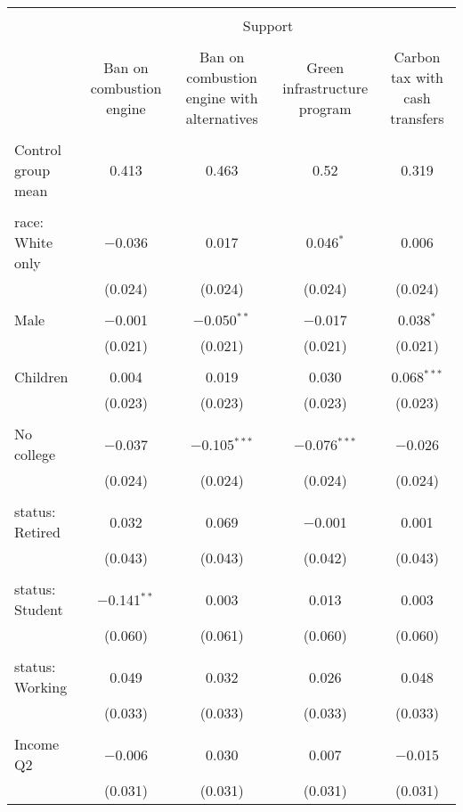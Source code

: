 
\begin{tabular}{@{\extracolsep{5pt}}lcccc} 
\\[-1.8ex]\hline 
\hline \\[-1.8ex] 
 & \multicolumn{4}{c}{Support} \\ 
\cline{2-5} 
\\[-1.8ex] & Ban on combustion engine & Ban on combustion engine with alternatives & Green infrastructure program & Carbon tax with cash transfers \\ 
\hline \\[-1.8ex] 
 Control group mean & 0.413 & 0.463 & 0.52 & 0.319  \\ \hline \\[-1.8ex] race: White only & $-$0.036 & 0.017 & 0.046$^{*}$ & 0.006 \\ 
  & (0.024) & (0.024) & (0.024) & (0.024) \\ 
  & & & & \\ 
 Male & $-$0.001 & $-$0.050$^{**}$ & $-$0.017 & 0.038$^{*}$ \\ 
  & (0.021) & (0.021) & (0.021) & (0.021) \\ 
  & & & & \\ 
 Children & 0.004 & 0.019 & 0.030 & 0.068$^{***}$ \\ 
  & (0.023) & (0.023) & (0.023) & (0.023) \\ 
  & & & & \\ 
 No college & $-$0.037 & $-$0.105$^{***}$ & $-$0.076$^{***}$ & $-$0.026 \\ 
  & (0.024) & (0.024) & (0.024) & (0.024) \\ 
  & & & & \\ 
 status: Retired & 0.032 & 0.069 & $-$0.001 & 0.001 \\ 
  & (0.043) & (0.043) & (0.042) & (0.043) \\ 
  & & & & \\ 
 status: Student & $-$0.141$^{**}$ & 0.003 & 0.013 & 0.003 \\ 
  & (0.060) & (0.061) & (0.060) & (0.060) \\ 
  & & & & \\ 
 status: Working & 0.049 & 0.032 & 0.026 & 0.048 \\ 
  & (0.033) & (0.033) & (0.033) & (0.033) \\ 
  & & & & \\ 
 Income Q2 & $-$0.006 & 0.030 & 0.007 & $-$0.015 \\ 
  & (0.031) & (0.031) & (0.031) & (0.031) \\ 

\end{tabular}
